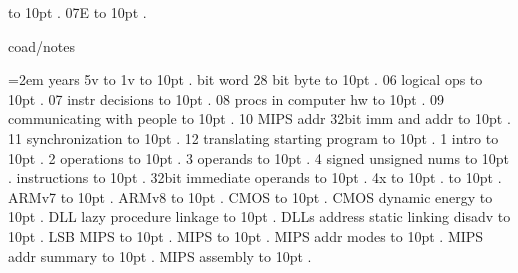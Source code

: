  \leaders\hbox to 10pt {\hss.\hss}  \hfill {}
\smallskip
07E \leaders\hbox to 10pt {\hss.\hss}  \hfill {}
\smallskip
\par\endgroup
\bigskip
{}
coad/notes
\par\begingroup
\leftskip=2em
\smallskip
{} years 5v to 1v \leaders\hbox to 10pt {\hss.\hss}  \hfill {}
 bit word 28 bit byte \leaders\hbox to 10pt {\hss.\hss}  \hfill {}
 06 logical ops \leaders\hbox to 10pt {\hss.\hss}  \hfill {}
 07 instr decisions \leaders\hbox to 10pt {\hss.\hss}  \hfill {}
 08 procs in computer hw \leaders\hbox to 10pt {\hss.\hss}  \hfill {}
 09 communicating with people \leaders\hbox to 10pt {\hss.\hss}  \hfill {}
 10 MIPS addr 32bit imm and addr \leaders\hbox to 10pt {\hss.\hss}  \hfill {}
 11 synchronization \leaders\hbox to 10pt {\hss.\hss}  \hfill {}
 12 translating starting program \leaders\hbox to 10pt {\hss.\hss}  \hfill {}
 1 intro \leaders\hbox to 10pt {\hss.\hss}  \hfill {}
 2 operations \leaders\hbox to 10pt {\hss.\hss}  \hfill {}
 3 operands \leaders\hbox to 10pt {\hss.\hss}  \hfill {}
 4 signed unsigned nums \leaders\hbox to 10pt {\hss.\hss}  \hfill {}
 instructions \leaders\hbox to 10pt {\hss.\hss}  \hfill {}
\smallskip
32bit immediate operands \leaders\hbox to 10pt {\hss.\hss}  \hfill {}
\smallskip
4x \leaders\hbox to 10pt {\hss.\hss}  \hfill {}
 \leaders\hbox to 10pt {\hss.\hss}  \hfill {}
\smallskip
ARMv7 \leaders\hbox to 10pt {\hss.\hss}  \hfill {}
\smallskip
ARMv8 \leaders\hbox to 10pt {\hss.\hss}  \hfill {}
\smallskip
CMOS \leaders\hbox to 10pt {\hss.\hss}  \hfill {}
\smallskip
CMOS dynamic energy \leaders\hbox to 10pt {\hss.\hss}  \hfill {}
\smallskip
DLL lazy procedure linkage \leaders\hbox to 10pt {\hss.\hss}  \hfill {}
\smallskip
DLLs address static linking disadv \leaders\hbox to 10pt {\hss.\hss}  \hfill {}
\smallskip
LSB MIPS \leaders\hbox to 10pt {\hss.\hss}  \hfill {}
\smallskip
MIPS \leaders\hbox to 10pt {\hss.\hss}  \hfill {}
\smallskip
MIPS addr modes \leaders\hbox to 10pt {\hss.\hss}  \hfill {}
\smallskip
MIPS addr summary \leaders\hbox to 10pt {\hss.\hss}  \hfill {}
\smallskip
MIPS assembly \leaders\hbox to 10pt {\hss.\hss}  \hfill {}
\smallskip
